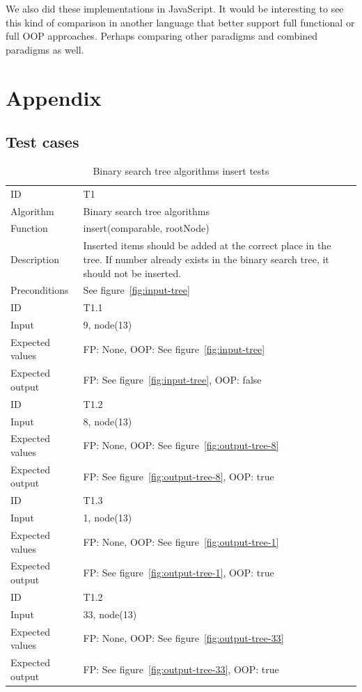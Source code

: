 \documentclass {article}
\begin{document}
We also did these implementations in JavaScript. It would be interesting to see this kind of comparison in another language that better support full functional or full OOP approaches. Perhaps comparing other paradigms and combined paradigms as well.



\appendix
\section{Appendix}
\label{appendix:test-cases}
\subsection{Test cases}
\begin{table}[H]
\begin{tabular}{ | l p{10cm} | }
\hline
ID & T1 \\
Algorithm & Binary search tree algorithms \\
Function & insert(comparable, rootNode) \\
Description & Inserted items should be added at the correct place in the tree. If number already exists in the binary search tree, it should not be inserted. \\
Preconditions & See figure~\ref{fig:input-tree} \\
\hline
ID & T1.1 \\
Input & 9, node(13) \\
Expected values & FP: None, OOP: See figure~\ref{fig:input-tree} \\
Expected output & FP: See figure~\ref{fig:input-tree}, OOP: false \\
\hline
ID & T1.2 \\
Input & 8, node(13) \\
Expected values & FP: None, OOP: See figure~\ref{fig:output-tree-8} \\
Expected output & FP: See figure~\ref{fig:output-tree-8}, OOP: true \\
\hline
ID & T1.3 \\
Input & 1, node(13) \\
Expected values & FP: None, OOP: See figure~\ref{fig:output-tree-1} \\
Expected output & FP: See figure~\ref{fig:output-tree-1}, OOP: true \\
\hline
ID & T1.2 \\
Input & 33, node(13) \\
Expected values & FP: None, OOP: See figure~\ref{fig:output-tree-33} \\
Expected output & FP: See figure~\ref{fig:output-tree-33}, OOP: true \\
\hline
\end{tabular}
\caption{Binary search tree algorithms insert tests}
\label{tab:insert-tests}
\end{table}
\end{document}
